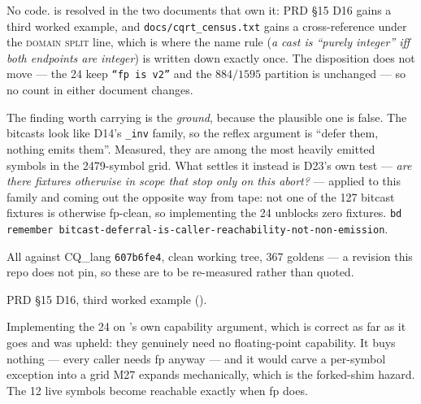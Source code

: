 No code.  is resolved in the two documents that own it: PRD \S15 D16 gains a
third worked example, and \texttt{docs/cqrt\_census.txt} gains a cross-reference under the
\textsc{domain split} line, which is where the name rule (\emph{a cast is ``purely
integer'' iff both endpoints are integer}) is written down exactly once. The disposition
does not move --- the 24 keep \texttt{``fp is v2''} and the $884/1595$ partition is
unchanged --- so no count in either document changes.

The finding worth carrying is the \emph{ground}, because the plausible one is false. The
bitcasts look like D14's \texttt{\_inv} family, so the reflex argument is ``defer them,
nothing emits them''. Measured, they are among the most heavily emitted symbols in the
2479-symbol grid. What settles it instead is D23's own test --- \emph{are there fixtures
otherwise in scope that stop only on this abort?} --- applied to this family and coming out
the opposite way from tape: not one of the 127 bitcast fixtures is otherwise fp-clean, so
implementing the 24 unblocks zero fixtures. \texttt{bd remember
bitcast-deferral-is-caller-reachability-not-non-emission}.

All against CQ\_lang \texttt{607b6fe4}, clean working tree, 367 goldens --- a revision this
repo does not pin, so these are to be re-measured rather than quoted.
\begin{figures}
\end{figures}

PRD \S15 D16, third worked example ().

Implementing the 24 on 's own capability argument, which is correct as far as it
goes and was upheld: they genuinely need no floating-point capability. It buys nothing ---
every caller needs fp anyway --- and it would carve a per-symbol exception into a grid M27
expands mechanically, which is the forked-shim hazard. The 12 live symbols become reachable
exactly when fp does.

